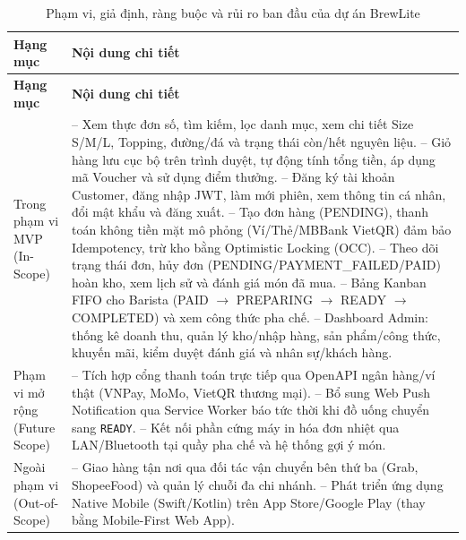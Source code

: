 \documentclass[12pt,a4paper]{report}
\begin{document}
\begin{longtable}{>{\raggedright\arraybackslash}p{3.8cm}>{\raggedright\arraybackslash}p{11.4cm}}
\caption{Phạm vi, giả định, ràng buộc và rủi ro ban đầu của dự án BrewLite}\\
\hline
\rowcolor{gray!20} \textbf{Hạng mục} & \textbf{Nội dung chi tiết} \\
\hline
\endfirsthead
\hline
\rowcolor{gray!20} \textbf{Hạng mục} & \textbf{Nội dung chi tiết} \\
\hline
\endhead
Trong phạm vi MVP (In-Scope) & -- Xem thực đơn số, tìm kiếm, lọc danh mục, xem chi tiết Size S/M/L, Topping, đường/đá và trạng thái còn/hết nguyên liệu. \newline
-- Giỏ hàng lưu cục bộ trên trình duyệt, tự động tính tổng tiền, áp dụng mã Voucher và sử dụng điểm thưởng. \newline
-- Đăng ký tài khoản Customer, đăng nhập JWT, làm mới phiên, xem thông tin cá nhân, đổi mật khẩu và đăng xuất. \newline
-- Tạo đơn hàng (PENDING), thanh toán không tiền mặt mô phỏng (Ví/Thẻ/MBBank VietQR) đảm bảo Idempotency, trừ kho bằng Optimistic Locking (OCC). \newline
-- Theo dõi trạng thái đơn, hủy đơn (PENDING/PAYMENT\_FAILED/PAID) hoàn kho, xem lịch sử và đánh giá món đã mua. \newline
-- Bảng Kanban FIFO cho Barista (PAID $\rightarrow$ PREPARING $\rightarrow$ READY $\rightarrow$ COMPLETED) và xem công thức pha chế. \newline
-- Dashboard Admin: thống kê doanh thu, quản lý kho/nhập hàng, sản phẩm/công thức, khuyến mãi, kiểm duyệt đánh giá và nhân sự/khách hàng. \\
\hline
Phạm vi mở rộng (Future Scope) & -- Tích hợp cổng thanh toán trực tiếp qua OpenAPI ngân hàng/ví thật (VNPay, MoMo, VietQR thương mại). \newline
-- Bổ sung Web Push Notification qua Service Worker báo tức thời khi đồ uống chuyển sang \texttt{READY}. \newline
-- Kết nối phần cứng máy in hóa đơn nhiệt qua LAN/Bluetooth tại quầy pha chế và hệ thống gợi ý món. \\
\hline
Ngoài phạm vi (Out-of-Scope) & -- Giao hàng tận nơi qua đối tác vận chuyển bên thứ ba (Grab, ShopeeFood) và quản lý chuỗi đa chi nhánh. \newline
-- Phát triển ứng dụng Native Mobile (Swift/Kotlin) trên App Store/Google Play (thay bằng Mobile-First Web App). \newline

\end{longtable}
\end{document}
